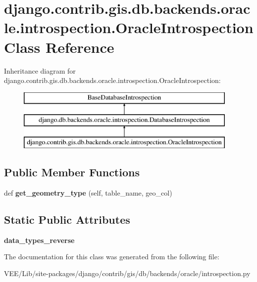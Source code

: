 \hypertarget{classdjango_1_1contrib_1_1gis_1_1db_1_1backends_1_1oracle_1_1introspection_1_1_oracle_introspection}{}\section{django.\+contrib.\+gis.\+db.\+backends.\+oracle.\+introspection.\+Oracle\+Introspection Class Reference}
\label{classdjango_1_1contrib_1_1gis_1_1db_1_1backends_1_1oracle_1_1introspection_1_1_oracle_introspection}
Inheritance diagram for django.\+contrib.\+gis.\+db.\+backends.\+oracle.\+introspection.\+Oracle\+Introspection\+:\begin{figure}[H]
\begin{center}
\leavevmode
\includegraphics[height=3.000000cm]{classdjango_1_1contrib_1_1gis_1_1db_1_1backends_1_1oracle_1_1introspection_1_1_oracle_introspection}
\end{center}
\end{figure}
\subsection*{Public Member Functions}
\begin{DoxyCompactItemize}
\item 
\mbox{\label{classdjango_1_1contrib_1_1gis_1_1db_1_1backends_1_1oracle_1_1introspection_1_1_oracle_introspection_a8d7bff2a10673b4a4eb777d117234be1}} 
def {\bfseries get\+\_\+geometry\+\_\+type} (self, table\+\_\+name, geo\+\_\+col)
\end{DoxyCompactItemize}
\subsection*{Static Public Attributes}
\begin{DoxyCompactItemize}
\item 
\mbox{\label{classdjango_1_1contrib_1_1gis_1_1db_1_1backends_1_1oracle_1_1introspection_1_1_oracle_introspection_aaf28d3374dd8d53deb3fddd712232329}} 
{\bfseries data\+\_\+types\+\_\+reverse}
\end{DoxyCompactItemize}


The documentation for this class was generated from the following file\+:\begin{DoxyCompactItemize}
\item 
V\+E\+E/\+Lib/site-\/packages/django/contrib/gis/db/backends/oracle/introspection.\+py\end{DoxyCompactItemize}
